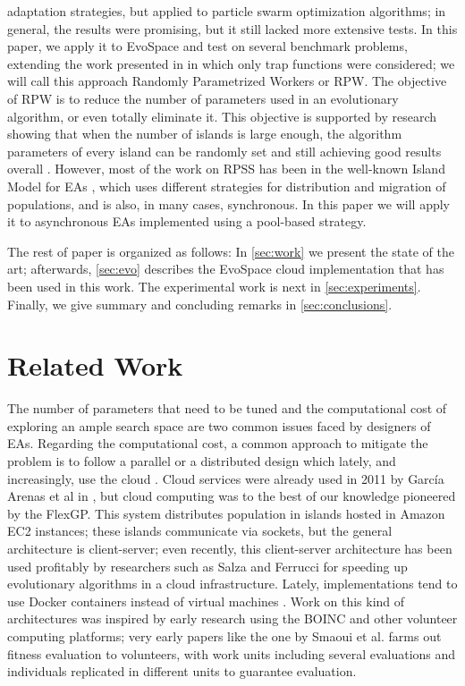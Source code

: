 \documentclass[conference]{IEEEtran}
\begin{document}
adaptation strategies, but applied to particle swarm optimization
algorithms; in general, the results were promising, but it still lacked more extensive tests.
In this paper, we apply it to EvoSpace and test on
several benchmark problems, extending the work presented in \cite{LNCS86720702}
in which only trap functions were considered; we will call this
approach Randomly Parametrized Workers or RPW. The objective of RPW is
to reduce the number of parameters used in an evolutionary algorithm,
or even totally eliminate it. This objective is supported by research
showing that when the number of islands 
is large enough, the algorithm parameters of every island can be randomly
set and still achieving good results overall \cite{fuku2}. 
However, most of the work on 
RPSS has been in the well-known Island Model for EAs
\cite{ALBA2001451}, which uses different strategies for distribution
and migration of populations, and is also, in many cases, synchronous.
In this paper we will apply 
it to asynchronous EAs implemented using a pool-based strategy.

The rest of paper is organized as follows: In \autoref{sec:work} we
present the state of the art; afterwards, \autoref{sec:evo} describes the
EvoSpace cloud implementation that has been used in this work. The
experimental work is next in 
\autoref{sec:experiments}. Finally, we give summary and concluding remarks in
\autoref{sec:conclusions}.

\section{Related Work}
\label{sec:work}

The number of parameters that need to be tuned and the computational
cost of exploring an ample search space are two common issues faced by
designers of EAs. Regarding the computational cost, a common approach
to mitigate the problem is to follow a parallel or a distributed
design \cite{cantu-paz:migration-policies,duda2013gpu} which lately,
and increasingly, use the cloud \cite{10.1007/978-3-319-45823-6_8}. Cloud services were already
used in 2011 by Garc\'ia Arenas et al in
\cite{DBLP:conf/gecco/ArenasGCLRM11}, but cloud computing was to the
best of our knowledge pioneered by  the FlexGP. This system
distributes population in islands hosted in Amazon EC2 instances;
these islands communicate via sockets, but the general architecture
is client-server; even recently, this client-server architecture has been
used profitably by researchers such as Salza and Ferrucci
\cite{SALZA2019276} for speeding up evolutionary algorithms in a cloud
infrastructure. Lately, implementations tend to use Docker containers
instead of virtual machines \cite{Dziurzanski2020}. Work on this kind
of architectures was inspired by early research using the BOINC and
other volunteer computing platforms; very early papers like the one by
Smaoui et al. \cite{FekiNG09} farms out fitness evaluation to
volunteers, with work units including several evaluations and
individuals replicated in different units to guarantee evaluation.
\end{document}
